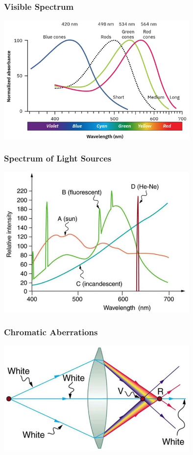 \documentclass{beamer}
\begin{document}
\begin{frame}\frametitle{Visible Spectrum}

\begin{center}
\includegraphics[width=10cm]{fig/visSpec.jpg}
\end{center}

\end{frame}

\begin{frame}\frametitle{Spectrum of Light Sources}

\begin{center}
\includegraphics[width=10cm]{fig/lightSpec.jpg}
\end{center}

\end{frame}

\begin{frame}\frametitle{Chromatic Aberrations}

\begin{center}
\includegraphics[width=10cm]{fig/chromeAbb.jpg}
\end{center}

\end{frame}
\end{document}
